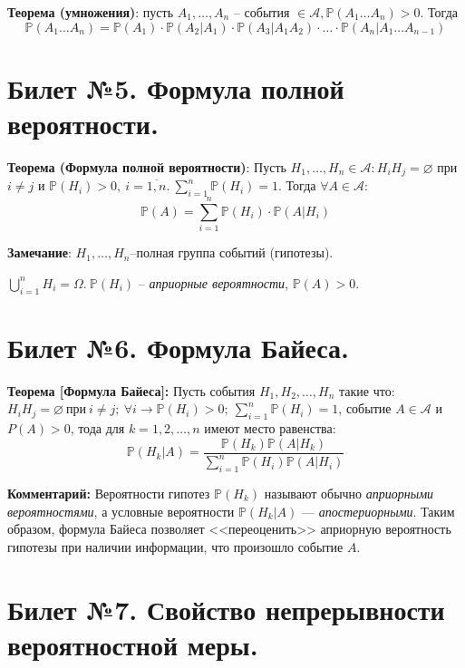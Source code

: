 \textbf{Теорема (умножения)}: пусть $A_1, \ldots, A_n$ -- события $\in \mathscr{A}, \mathbb{P}(A_1\dots A_n)>0$. Тогда\\
$$\mathbb{P}(A_1\dots A_n) = \mathbb{P}(A_1)\cdot \mathbb{P}(A_2|A_1)\cdot \mathbb{P}(A_3|A_1 A_2)\cdot {\dots} \cdot \mathbb{P}(A_n|A_1\dots A_{n-1})$$

\section{Билет №5. Формула полной вероятности.}
\hspace*{\parindent} \textbf{Теорема (Формула полной вероятности)}: Пусть $H_1,{\dots}, H_n \in \mathscr{A}: H_i H_j = \varnothing$ при $i\neq j$ и $\mathbb{P}(H_i)>0,~i = \overline{1,n}.~\sum\limits_{i = 1}^{n} {\mathbb{P}(H_i)} = 1$. Тогда $\forall A \in \mathscr{A}$:
$$\mathbb{P}(A) = \sum_{i = 1}^{n} {\mathbb{P}(H_i)\cdot \mathbb{P}(A|H_i)}$$

\textbf{Замечание}: $H_1,{\dots}, H_n$--полная группа событий (гипотезы).

$\bigcup\limits_{i = 1}^{n} {H_i} = \Omega.~\mathbb{P}(H_i)$ -- \textit{априорные вероятности}, $\mathbb{P}(A)>0$.
	
\section{Билет №6. Формула Байеса.}

\hspace*{\parindent} \textbf{Теорема [Формула Байеса]:} Пусть события $H_1, H_2, \dots, H_n$ такие что: $H_i H_j = \varnothing ~ \text{при} ~ i \neq j; ~ \forall i \rightarrow \mathbb{P}(H_i) > 0; ~ \sum\limits_{i = 1}^{n}{\mathbb{P}(H_i)} = 1$, событие $A \in \mathscr{A}$ и $P(A) > 0$, тода для $k = 1, 2, \ldots, n$ имеют место равенства:
\begin{equation*}
	\mathbb{P}(H_k | A) = \frac{\mathbb{P}(H_k) \mathbb{P}(A | H_k)}{\sum\limits_{i = 1}^{n} {\mathbb{P}(H_i) \mathbb{P}(A | H_i)}}
\end{equation*}

 \textbf{Комментарий:} Вероятности гипотез $\mathbb{P}(H_k)$ называют обычно \textit{априорными вероятностями}, а условные вероятности $\mathbb{P}(H_k|A)$ — \textit{апостериорными}. Таким образом, формула
Байеса позволяет <<переоценить>> априорную вероятность гипотезы при наличии информации, что произошло событие $A$.

\section{Билет №7. Свойство непрерывности вероятностной меры.}

